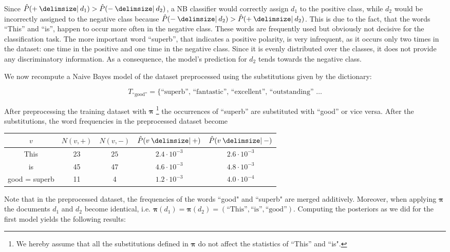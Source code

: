 Since $\hat{P}(+ \given d_1) > \hat{P}(- \given d_2)$, a NB classifier
would correctly assign $d_1$ to the positive class, while $d_2$ would be
incorrectly assigned to the negative class because $\hat{P}(- \given d_2) >
\hat{P}(+ \given d_2)$. This is due to the fact, that the words ``This'' and
``is'', happen to occur more often in the negative class. These words are frequently
used but obviously not decisive for the classification task. The more important
word ``superb'', that indicates a positive polarity, is very infrequent, as it occurs only two
times in the dataset: one time in the positive and one time in the negative
class. Since it is evenly distributed over the classes, it does not provide any
discriminatory information. As a consequence, the model's
prediction for $d_2$ tends towards the negative class.

We now recompute a Naive Bayes model of the dataset preprocessed using the
substitutions given by the dictionary:

\begin{equation*}
T_{\text{``good''}} = \{ \text{``superb'', ``fantastic'', ``excellent'',
``outstanding'' \ldots}
\end{equation*}

After preprocessing the training dataset with $\boldsymbol \pi$ \footnote{We
hereby assume that all the substitutions defined in $\boldsymbol \pi$  do not affect the statistics of
``This'' and ``is".} the occurrences of ``superb'' are substituted with 
``good'' or vice versa. After the substitutions, the word frequencies in the
preprocessed dataset become

\begin{center}
\begin{tabular}{|c|c|c|c|c}
$v$ & $N(v, +)$ & $N(v,-)$ & $\hat{P}(v\given +)$ & $\hat{P}(v \given -)$ \\
\hline
This & $23$ & $25$ & $2.4\cdot 10^{-3}$  & $2.6 \cdot 10^{-3}$\\
is & 45 & 47 & $4.6\cdot 10^{-3}$ &  $4.8\cdot 10^{-3}$ \\
good = superb& 11 & 4 & $1.2 \cdot 10^{-3}$ & $4.0 \cdot 10^{-4}$ \\
\end{tabular}
\end{center}

Note that in the preprocessed dataset, the frequencies of the words ``good"
and ``superb" are merged additively. Moreover, when applying $\boldsymbol \pi$
the documents $d_1$ and $d_2$ become identical, i.e. $\boldsymbol \pi(d_1) = \boldsymbol \pi(d_2) = (\text{``This''}, \text{``is''}, \text{``good''})$.
Computing the posteriors as we did for the first model
yields the following results:

